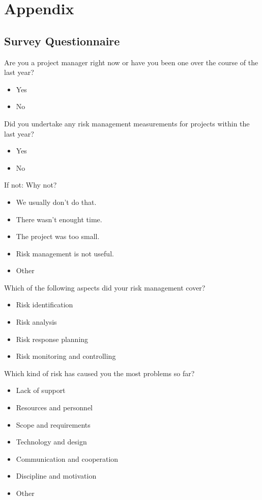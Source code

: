 \chapter{Appendix}
\label{ch:app-A}

\section{Survey Questionnaire}
\label{appquestionnaire}

Are you a project manager right now or have you been one over the course of the last year?
\begin{itemize}
	\item Yes
	\item No
\end{itemize}

Did you undertake any risk management measurements for projects within the last year?
\begin{itemize}
	\item Yes
	\item No
\end{itemize}

If not: Why not?
\begin{itemize}
	\item We usually don't do that.
	\item There wasn't enought time.
	\item The project was too small.
	\item Risk management is not useful.
	\item Other
\end{itemize}

Which of the following aspects did your risk management cover?
\begin{itemize}
	\item Risk identification
	\item Risk analysis
	\item Risk response planning
	\item Risk monitoring and controlling
\end{itemize}


Which kind of risk has caused you the most problems so far?
\begin{itemize}
	\item Lack of support
	\item Resources and personnel
	\item Scope and requirements
	\item Technology and design
	\item Communication and cooperation
	\item Discipline and motivation
	\item Other
\end{itemize}


